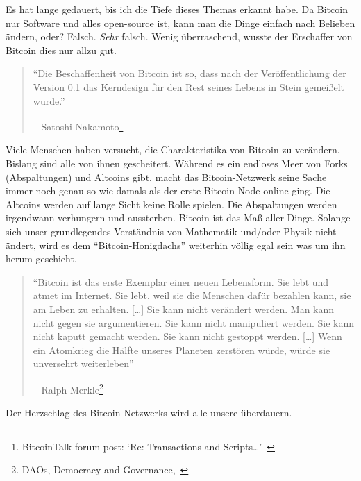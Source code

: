 Es hat lange gedauert, bis ich die Tiefe dieses Themas erkannt habe. Da Bitcoin
nur Software und alles open-source ist, kann man die Dinge einfach nach Belieben
ändern, oder? Falsch. \textit{Sehr} falsch. Wenig überraschend, wusste der
Erschaffer von Bitcoin dies nur allzu gut.

\begin{quotation}\begin{samepage}
\enquote{Die Beschaffenheit von Bitcoin ist
so, dass nach der Veröffentlichung der Version 0.1 das Kerndesign für den Rest
seines Lebens in Stein gemeißelt wurde.} \begin{flushright} -- Satoshi
Nakamoto\footnote{BitcoinTalk forum post: `Re:
Transactions and Scripts\ldots'~\cite{satoshi-set-in-stone}}
\end{flushright}\end{samepage}\end{quotation}

Viele Menschen haben versucht, die Charakteristika von Bitcoin zu verändern.
Bislang sind alle von ihnen gescheitert. Während es ein endloses Meer von Forks
(Abspaltungen) und Altcoins gibt, macht das Bitcoin-Netzwerk seine Sache immer
noch genau so wie damals als der erste Bitcoin-Node online ging. Die Altcoins
werden auf lange Sicht keine Rolle spielen. Die Abspaltungen werden irgendwann
verhungern und aussterben. Bitcoin ist das Maß aller Dinge. Solange sich unser
grundlegendes Verständnis von Mathematik und/oder Physik nicht ändert, wird es
dem “Bitcoin-Honigdachs” weiterhin völlig egal sein was um ihn herum geschieht.

\begin{quotation}\begin{samepage}
\enquote{Bitcoin ist das erste Exemplar einer neuen Lebensform. Sie lebt und
atmet im Internet. Sie lebt, weil sie die Menschen dafür bezahlen kann, sie am
Leben zu erhalten. [\ldots] Sie kann nicht verändert werden. Man kann nicht
gegen sie argumentieren. Sie kann nicht manipuliert werden. Sie kann nicht
kaputt gemacht werden. Sie kann nicht gestoppt werden. [\ldots] Wenn ein
Atomkrieg die Hälfte unseres Planeten zerstören würde, würde sie unversehrt
weiterleben}
\begin{flushright} -- Ralph Merkle\footnote{DAOs, Democracy and
Governance,~\cite{merkle-dao}}
\end{flushright}\end{samepage}\end{quotation}

Der Herzschlag des Bitcoin-Netzwerks wird alle unsere überdauern.


